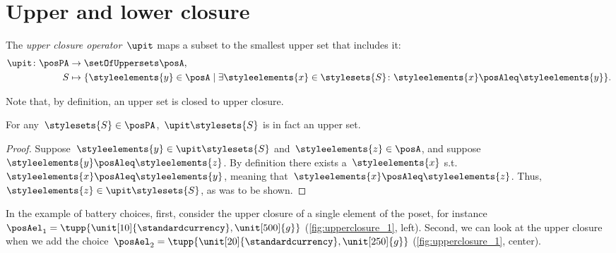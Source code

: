 
\section[Antichains]{Upper and lower closure}

\begin{definition}
    \label{def:upperclosure}
    The \emph{upper closure operator}~$\upit $ maps a subset to the smallest upper set that includes it:
    \begin{equation}
        \begin{aligned}
            \upit  \colon \posPA & \to \setOfUppersets\posA,                                                                                                                  \\
            S                    & \mapsto \{\styleelements{y}\in \posA \mid \exists \styleelements{x}\in \stylesets{S} \colon \styleelements{x}\posAleq \styleelements{y}\}.
        \end{aligned}
    \end{equation}
\end{definition}
\begin{remark}
    Note that, by definition, an upper set is closed to upper closure.
\end{remark}
\begin{lemma}
    For any~$\stylesets{S}\in \posPA$,~$\upit  \stylesets{S}$ is in fact an upper set.
\end{lemma}
\begin{proof}
    Suppose~$\styleelements{y}\in \upit  \stylesets{S}$ and~$\styleelements{z}\in \posA$, and suppose $\styleelements{y}\posAleq \styleelements{z}$.
    By definition there exists a~$\styleelements{x}$ s.t.~$\styleelements{x}\posAleq \styleelements{y}$, meaning that~$\styleelements{x}\posAleq \styleelements{z}$.
    Thus,~$\styleelements{z}\in \upit  \stylesets{S}$, as was to be shown.
\end{proof}

In the example of battery choices,  first, consider the upper closure of a single element of the poset, for instance~$\posAel_1=\tupp{\unit[10]{\standardcurrency},\unit[500]{g}}$ (\cref{fig:upperclosure_1}, left).
Second, we can look at the upper closure when we add the choice~$\posAel_2=\tupp{\unit[20]{\standardcurrency},\unit[250]{g}}$ (\cref{fig:upperclosure_1}, center).

